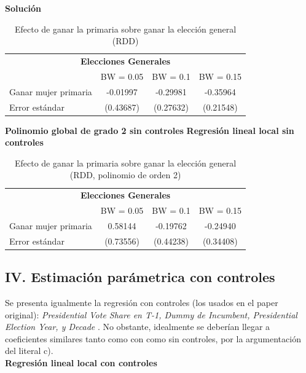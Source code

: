 \documentclass[a4paper, answers, addpoints, 11pt]{exam}
\newenvironment{solucion}{%
  \begin{mdframed}[
    backgroundcolor=blue!5,    %
    linecolor=blue!50,          %
    linewidth=2pt,              %
    leftmargin=10pt,            %
    rightmargin=8pt,           %
    topline=true,              %
    bottomline=true,            %
    roundcorner=10pt,           %
    innerleftmargin=10pt,       %
    innerrightmargin=10pt,      %
    innerbottommargin=10pt,     %
    innertopmargin=10pt         %
  ]%
  \begin{tcolorbox}[colframe=blue!50!black, colback=blue!50, coltitle=white, sharp corners=all, boxrule=1mm, width=\textwidth, halign=left, valign=center, top=0mm, bottom=0mm, left=0mm, right=0mm] \textbf{Solución} \end{tcolorbox} }{\end{mdframed}}
\begin{document}
\begin{enumerate}[resume]
\begin{enumerate}
\begin{solucion}
\begin{table}[H]
\centering
\caption{Efecto de ganar la primaria sobre ganar la elección general (RDD)}
\label{tab:rdd_genwin_bandwidths}
\begin{tabular}{lccc}
\toprule
\multicolumn{4}{c}{\textbf{Elecciones Generales}} \\
\cmidrule(lr){2-4}
& BW = 0.05 & BW = 0.1 & BW = 0.15 \\
\midrule
Ganar mujer primaria & -0.01997 & -0.29981 & -0.35964 \\
Error estándar       & (0.43687) & (0.27632) & (0.21548) \\
\bottomrule
\end{tabular}
\end{table}


\textbf{Polinomio global de grado 2 sin controles}
\textbf{Regresión lineal local sin controles}

\begin{table}[H]
\centering
\caption{Efecto de ganar la primaria sobre ganar la elección general (RDD, polinomio de orden 2)}
\label{tab:rdd_genwin_bandwidths_poly2}
\begin{tabular}{lccc}
\toprule
\multicolumn{4}{c}{\textbf{Elecciones Generales}} \\
\cmidrule(lr){2-4}
& BW = 0.05 & BW = 0.1 & BW = 0.15 \\
\midrule
Ganar mujer primaria & 0.58144  & -0.19762 & -0.24940 \\
Error estándar       & (0.73556) & (0.44238) & (0.34408) \\
\bottomrule
\end{tabular}
\end{table}

\subsection*{IV. Estimación parámetrica con controles}
Se presenta igualmente la regresión con controles (los usados en el paper original): \textit{
 Presidential Vote Share en T-1, Dummy de Incumbent, Presidential Election Year, y
Decade
 }. No obstante, idealmente se deberían llegar a coeficientes similares tanto como con como sin controles, por la argumentación del literal c). \\
 
\textbf{Regresión lineal local con controles}


\end{solucion}
\end{enumerate}
\end{enumerate}
\end{document}
